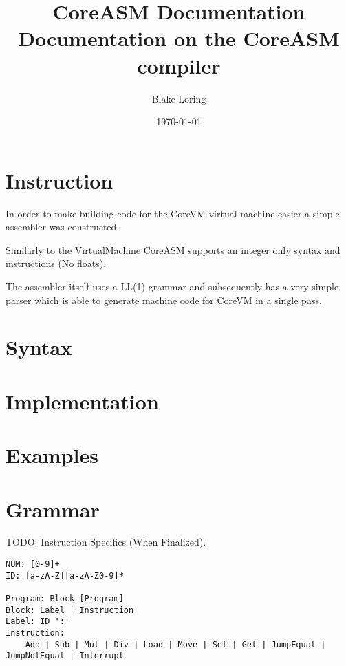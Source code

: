 \documentclass{article}
\title{CoreASM Documentation \\ \large Documentation on the CoreASM compiler}
\author{Blake Loring}
\date{\today}
\begin{document}
\maketitle

\section* {Instruction}
In order to make building code for the CoreVM virtual machine easier a simple assembler was constructed.

Similarly to the VirtualMachine CoreASM supports an integer only syntax and instructions (No floats).

The assembler itself uses a LL(1) grammar and subsequently has a very simple parser which is able to generate machine code for CoreVM in a single pass. 
\section* {Syntax}
\section* {Implementation}
\section* {Examples}
\section* {Grammar}

TODO: Instruction Specifics (When Finalized).

\begin{verbatim}
NUM: [0-9]+
ID: [a-zA-Z][a-zA-Z0-9]*

Program: Block [Program]
Block: Label | Instruction
Label: ID ':'
Instruction:
	Add | Sub | Mul | Div | Load | Move | Set | Get | JumpEqual | JumpNotEqual | Interrupt
\end{verbatim}
\end{document}
